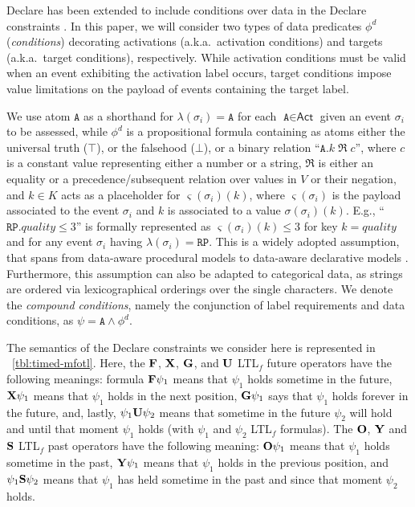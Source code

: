 Declare has been extended to include conditions over data in the Declare constraints \cite{BurattinMS16}. In this paper, we will consider two types of data predicates $\phi^d$ (\textit{conditions}) decorating activations (a.k.a.\ activation conditions) and targets (a.k.a.\ target conditions), respectively.
While activation conditions must be valid when an event exhibiting the activation label occurs, target conditions impose value limitations on the payload of events containing the target label.


We use atom $\texttt{A}$ as a shorthand for $\lambda(\sigma_i)=\texttt{A}$ for each $\texttt{A}\in\textsf{Act}$ given an event $\sigma_i$ to be assessed, while $\phi^d$ is a propositional formula containing as atoms either the universal truth ($\top$), or the falsehood ($\bot$), or a binary relation ``$\texttt{A}.k\;\Re\;c$'', where $c$ is a constant value representing either a number or a string, $\Re$ is either an equality or a precedence/subsequent relation over values in $V$ or their negation, and $k\in K$ acts as a placeholder for $\varsigma(\sigma_i)(k)$, where $\varsigma(\sigma_i)$ is the payload associated to the event $\sigma_i$ and $k$ is associated to a value $\sigma(\sigma_i)(k)$. E.g., ``$\texttt{RP}.\textit{quality}\leq 3$'' is formally represented as $\varsigma(\sigma_i)(k)\leq 3$ for key $k=quality$ and for any event $\sigma_i$ having $\lambda(\sigma_i)=\texttt{RP}$.  This is a widely adopted assumption, that spans from data-aware procedural models \cite{MultiPerspective} to data-aware declarative models \cite{BurattinMS16}. Furthermore, this assumption can also be adapted to categorical data, as strings are ordered via lexicographical orderings over the single characters. We denote the \textit{compound conditions}, namely the conjunction of label requirements and data conditions, as $\psi=\texttt{A}\wedge \phi^d$.



The semantics of the Declare constraints we consider here is represented in \tablename~\ref{tbl:timed-mfotl}.
Here, the $\mathbf{F}$, $\mathbf{X}$, $\mathbf{G}$, and $\mathbf{U}$ LTL$_f$ future operators have the following meanings: formula $\mathbf{F} \psi_1$ means that $\psi_1$ holds sometime in the future, $\mathbf{X} \psi_1$ means that $\psi_1$
holds in the next position, $\mathbf{G} \psi_1$ says that $\psi_1$ holds forever in the future, and, lastly, $\psi_1 \mathbf{U} \psi_2$ means that sometime in the future $\psi_2$ will hold and
until that moment $\psi_1$ holds (with $\psi_1$ and $\psi_2$ LTL$_f$ formulas).
The $\mathbf{O}$, $\mathbf{Y}$ and $\mathbf{S}$ LTL$_f$ past operators have the following meaning:
$\mathbf{O} \psi_1$ means that $\psi_1$ holds sometime in the past,
$\mathbf{Y} \psi_1$ means that $\psi_1$ holds in the previous position,
and $\psi_1 \mathbf{S} \psi_2$ means that $\psi_1$ has held sometime in the past and since that moment $\psi_2$ holds.

